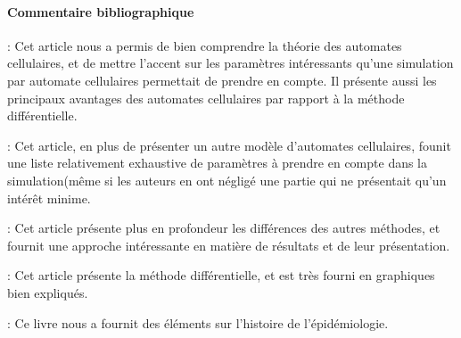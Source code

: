 \documentclass{article}
\begin{document}




\newpage

\paragraph{Commentaire bibliographique\\}
\noindent
\cite{ref1} : Cet article nous a permis de bien comprendre la théorie des automates cellulaires, et de mettre l'accent sur les paramètres intéressants qu'une simulation par automate cellulaires permettait de prendre en compte. Il présente aussi les principaux avantages des automates cellulaires par rapport à la méthode différentielle.

\cite{ref2} : Cet article, en plus de présenter un autre modèle d'automates cellulaires, founit une liste relativement exhaustive de paramètres à prendre en compte dans la simulation(même si les auteurs en ont négligé une partie qui ne présentait qu'un  intérêt minime.

\cite{ref3} : Cet article présente plus en profondeur les différences des autres méthodes,  et fournit une approche intéressante en matière de résultats et de leur présentation.

\cite{ref4} : Cet article présente la méthode différentielle, et est très fourni en graphiques bien expliqués.

\cite{ref5} : Ce livre nous a fournit des éléments sur l'histoire de l'épidémiologie.




\end{document}
